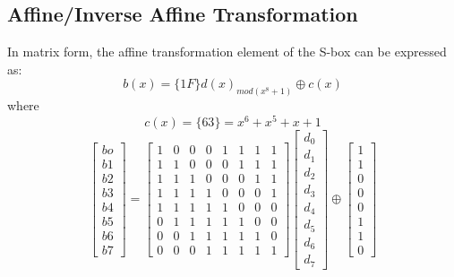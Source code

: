 \documentclass[10pt, conference, compsocconf]{IEEEtran}
\begin{document}
\subsection{Affine/Inverse Affine Transformation}
In matrix form, the affine transformation element of the S-box can be expressed as:
\begin{equation}
b(x)=\{1F\}d(x)_{mod (x^8+1)} \oplus c(x)
\end{equation}
where
\begin{equation}
c(x)=\{63\}=x^6+x^5+x+1 \nonumber
\end{equation}
\begin{equation}
\left[ \begin{array}{c}
bo\\b1\\b2\\b3\\b4\\b5\\b6\\b7 \end{array} \right] =
\left[ \begin{array}{cccccccc}
1 & 0 & 0 & 0 & 1 & 1 & 1 & 1\\
1 & 1 & 0 & 0 & 0 & 1 & 1 & 1\\
1 & 1 & 1 & 0 & 0 & 0 & 1 & 1\\
1 & 1 & 1 & 1 & 0 & 0 & 0 & 1\\
1 & 1 & 1 & 1 & 1 & 0 & 0 & 0\\
0 & 1 & 1 & 1 & 1 & 1 & 0 & 0\\
0 & 0 & 1 & 1 & 1 & 1 & 1 & 0\\
0 & 0 & 0 & 1 & 1 & 1 & 1 & 1
 \end{array} \right] \left[ \begin{array}{c}
d_0\\d_1\\d_2\\d_3\\d_4\\d_5\\d_6\\d_7 \end{array} \right]\oplus
 \left[ \begin{array}{c}
1\\1\\0\\0\\0\\1\\1\\0 \end{array} \right]
\end{equation}
\end{document}
